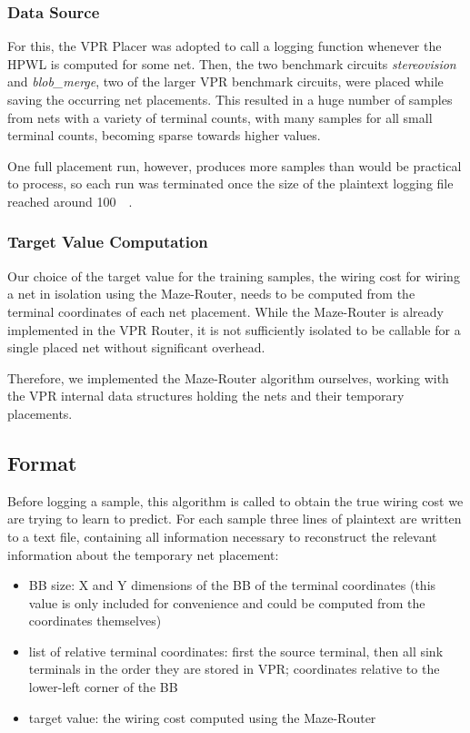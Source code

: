 \subsubsection{Data Source}

For this, the \gls{VPR} Placer was adopted to call a logging function whenever the \gls{HPWL} is computed for some net. Then, the two benchmark circuits \textit{stereovision} and \textit{blob\_merge}, two of the larger \gls{VPR} benchmark circuits, were placed while saving the occurring net placements. This resulted in a huge number of samples from nets with a variety of terminal counts, with many samples for all small terminal counts, becoming sparse towards higher values.

One full placement run, however, produces more samples than would be practical to process, so each run was terminated once the size of the plaintext logging file reached around \SI{100}{\mega\byte}.

\subsubsection{Target Value Computation}

Our choice of the target value for the training samples, the wiring cost for wiring a net in isolation using the Maze-Router, needs to be computed from the terminal coordinates of each net placement. While the Maze-Router is already implemented in the \gls{VPR} Router, it is not sufficiently isolated to be callable for a single placed net without significant overhead.

Therefore, we implemented the Maze-Router algorithm ourselves, working with the \gls{VPR} internal data structures holding the nets and their temporary placements.

\subsection{Format}

Before logging a sample, this algorithm is called to obtain the true wiring cost we are trying to learn to predict. For each sample three lines of plaintext are written to a text file, containing all information necessary to reconstruct the relevant information about the temporary net placement:

\begin{itemize}
	\item \gls{BB} size: X and Y dimensions of the \gls{BB} of the terminal coordinates (this value is only included for convenience and could be computed from the coordinates themselves)
	\item list of relative terminal coordinates: first the source terminal, then all sink terminals in the order they are stored in \gls{VPR}; coordinates relative to the lower-left corner of the \gls{BB}
	\item target value: the wiring cost computed using the Maze-Router
\end{itemize}


